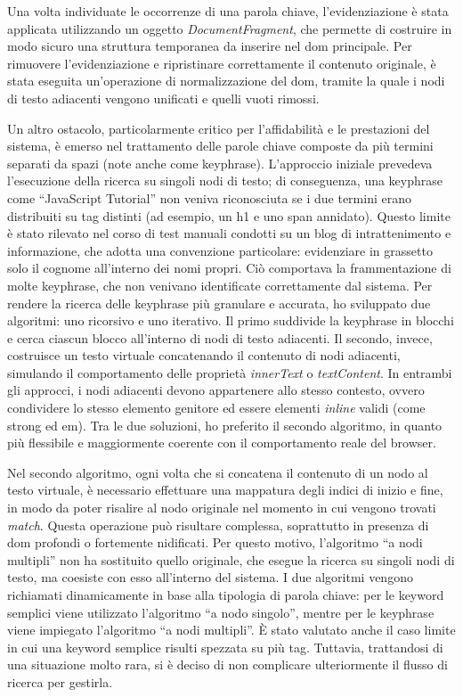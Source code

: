 \vspace{10pt}
\noindent Una volta individuate le occorrenze di una parola chiave, l’evidenziazione è stata applicata utilizzando un oggetto \textit{DocumentFragment}, che permette di costruire in modo sicuro una struttura temporanea da inserire nel \gls{dom} principale. Per rimuovere l’evidenziazione e ripristinare correttamente il contenuto originale, è stata eseguita un’operazione di normalizzazione del \gls{dom}, tramite la quale i nodi di testo adiacenti vengono unificati e quelli vuoti rimossi.

\vspace{10pt}
\noindent Un altro ostacolo, particolarmente critico per l’affidabilità e le prestazioni del sistema, è emerso nel trattamento delle parole chiave composte da più termini separati da spazi (note anche come keyphrase). L’approccio iniziale prevedeva l’esecuzione della ricerca su singoli nodi di testo; di conseguenza, una keyphrase come “JavaScript Tutorial” non veniva riconosciuta se i due termini erano distribuiti su tag distinti (ad esempio, un h1 e uno span annidato). Questo limite è stato rilevato nel corso di test manuali condotti su un blog di intrattenimento e informazione, che adotta una convenzione particolare: evidenziare in grassetto solo il cognome all’interno dei nomi propri. Ciò comportava la frammentazione di molte keyphrase, che non venivano identificate correttamente dal sistema. Per rendere la ricerca delle keyphrase più granulare e accurata, ho sviluppato due algoritmi: uno ricorsivo e uno iterativo. Il primo suddivide la keyphrase in blocchi e cerca ciascun blocco all’interno di nodi di testo adiacenti. Il secondo, invece, costruisce un testo virtuale concatenando il contenuto di nodi adiacenti, simulando il comportamento delle proprietà \textit{innerText} o \textit{textContent}. In entrambi gli approcci, i nodi adiacenti devono appartenere allo stesso contesto, ovvero condividere lo stesso elemento genitore ed essere elementi \textit{inline} validi (come strong ed em). Tra le due soluzioni, ho preferito il secondo algoritmo, in quanto più flessibile e maggiormente coerente con il comportamento reale del browser.

\vspace{10pt}
\noindent Nel secondo algoritmo, ogni volta che si concatena il contenuto di un nodo al testo virtuale, è necessario effettuare una mappatura degli indici di inizio e fine, in modo da poter risalire al nodo originale nel momento in cui vengono trovati \textit{match}. Questa operazione può risultare complessa, soprattutto in presenza di \gls{dom} profondi o fortemente nidificati. Per questo motivo, l’algoritmo “a nodi multipli” non ha sostituito quello originale, che esegue la ricerca su singoli nodi di testo, ma coesiste con esso all’interno del sistema. I due algoritmi vengono richiamati dinamicamente in base alla tipologia di parola chiave: per le keyword semplici viene utilizzato l’algoritmo “a nodo singolo”, mentre per le keyphrase viene impiegato l’algoritmo “a nodi multipli”. È stato valutato anche il caso limite in cui una keyword semplice risulti spezzata su più tag. Tuttavia, trattandosi di una situazione molto rara, si è deciso di non complicare ulteriormente il flusso di ricerca per gestirla.

